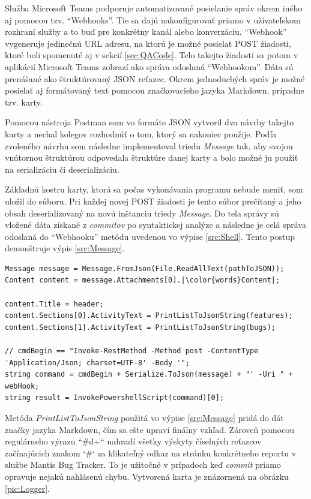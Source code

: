 \documentclass[slovak, bachelorpractice]{diploma}
\begin{document}
Služba Microsoft Teams podporuje automatizované posielanie správ okrem iného aj pomocou tzv. \enquote{Webhooks}. Tie sa dajú nakonfigurovať priamo v užívateľskom rozhraní služby a to buď pre konkrétny kanál alebo konverzáciu. \enquote{Webhook} vygeneruje jedinečnú URL adresu, na ktorú je možné posielať POST žiadosti, ktoré boli spomenuté aj v sekcií \ref{sec:QACode}. Telo takejto žiadosti sa potom v aplikácií Microsoft Teams zobrazí ako správa odoslaná \enquote{Webhookom}. Dáta sú prenášané ako štruktúrovaný JSON reťazec. Okrem jednoduchých správ je možné posielať aj formátovaný text pomocou značkovacieho jazyka Markdown, prípadne tzv. karty. 

Pomocou nástroja Postman som vo formáte JSON vytvoril dva návrhy takejto karty a nechal kolegov rozhodnúť o tom, ktorý sa nakoniec použije. Podľa zvoleného návrhu som následne implementoval triedu \textit{Message} tak, aby svojou vnútornou štruktúrou odpovedala štruktúre danej karty a bolo možné ju použiť na serializáciu či deserializáciu. 

Základnú kostru karty, ktorá sa počas vykonávania programu nebude meniť, som uložil do súboru. Pri každej novej POST žiadosti je tento súbor prečítaný a jeho obsah deserializovaný na novú inštanciu triedy \textit{Message}. Do tela správy sú vložené dáta získané z \textit{commitov} po syntaktickej analýze a následne je celá správa odoslaná do \enquote{Webhooku} metódu uvedenou vo výpise \ref{src:Shell}. Tento postup demonštruje výpis \ref{src:Message}. 
\vspace{10pt}
\begin{lstlisting}[label=src:Message,caption={Vytvorenie a odoslanie správy do služby Microsoft Teams}, escapechar={|}]
Message message = Message.FromJson(File.ReadAllText(pathToJSON));
Content content = message.Attachments[0].|\color{words}Content|;

content.Title = header;
content.Sections[0].ActivityText = PrintListToJsonString(features);
content.Sections[1].ActivityText = PrintListToJsonString(bugs);

// cmdBegin == "Invoke-RestMethod -Method post -ContentType 'Application/Json; charset=UTF-8' -Body '";
string command = cmdBegin + Serialize.ToJson(message) + "' -Uri " + webHook;
string result = InvokePowershellScript(command)[0];
\end{lstlisting}

Metóda \textit{PrintListToJsonString} použitá vo výpise  \ref{src:Message} pridá do dát značky jazyka Markdown, čím sa ešte upraví finálny vzhľad. Zároveň pomocou regulárneho výrazu \mbox{``\#\\d+``} nahradí všetky výskyty číselných reťazcov začínajúcich znakom `\#` za klikateľný odkaz na stránku konkrétneho reportu v službe Mantis Bug Tracker. To je užitočné v prípadoch keď \textit{commit} priamo opravuje nejakú nahlásenú chybu. Vytvorená karta je znázornená na obrázku \ref{pic:Logger}.
\end{document}
